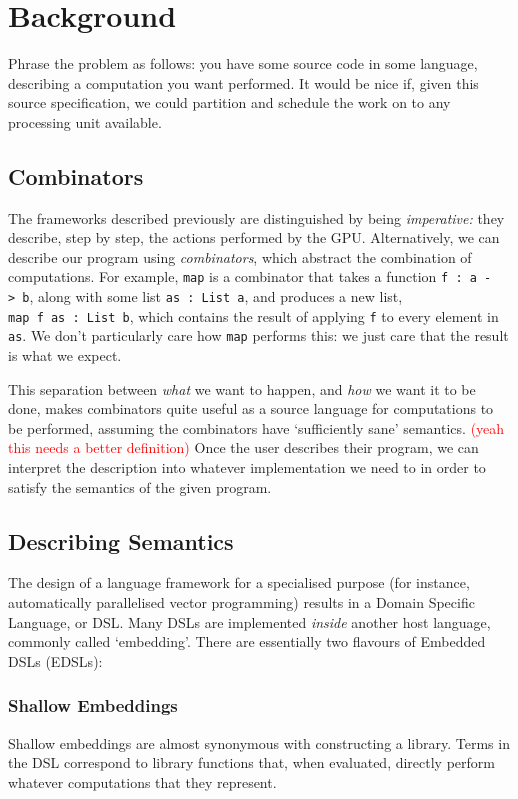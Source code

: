 \documentclass[a4paper,12pt]{article}
\newcommand{\red}[1]{\textcolor{red}{#1}}
\newcommand{\icf}[1]{\mbox{\texttt{#1}}} %
\begin{document}
\section{Background}
Phrase the problem as follows: you have some source code in some language, describing a computation you want performed. 
It would be nice if, given this source specification, we could partition and schedule the work on to any processing unit available. 

\subsection{Combinators}
The frameworks described previously are distinguished by being \textit{imperative:} they describe, step by step, the actions performed by the GPU.
Alternatively, we can describe our program using \textit{combinators}, which abstract the combination of computations. 
For example, \icf{map} is a combinator that takes a function \icf{f\ :\  a\ ->\ b}, along with some list \icf{as\ :\ List\ a}, and produces a new list, \icf{map\ f\ as\ :\ List\ b}, which contains the result of applying \icf{f} to every element in \icf{as}. 
We don't particularly care how \icf{map} performs this: we just care that the result is what we expect.

This separation between \textit{what} we want to happen, and \textit{how} we want it to be done, makes combinators quite useful as a source language for computations to be performed, assuming the combinators have `sufficiently sane' semantics. 
\red{(yeah this needs a better definition)} 
Once the user describes their program, we can interpret the description into whatever implementation we need to in order to satisfy the semantics of the given program.

\subsection{Describing Semantics}
The design of a language framework for a specialised purpose (for instance, automatically parallelised vector programming) results in a Domain Specific Language, or DSL. 
Many DSLs are implemented \textit{inside} another host language, commonly called `embedding'. There are essentially two flavours of Embedded DSLs (EDSLs):

\subsubsection*{Shallow Embeddings} 
Shallow embeddings are almost synonymous with constructing a library. 
Terms in the DSL correspond to library functions that, when evaluated, directly perform whatever computations that they represent.
\end{document}
